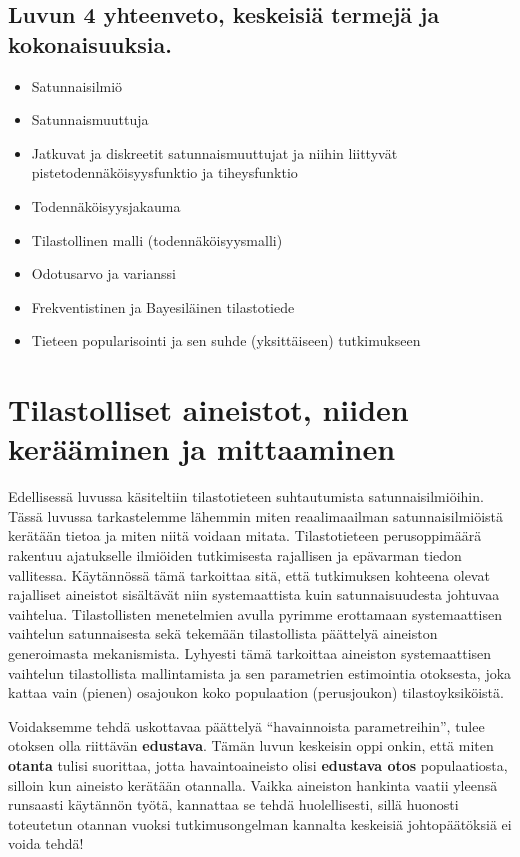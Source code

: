 \documentclass[
]{book}
\providecommand{\tightlist}{%
  \setlength{\itemsep}{0pt}\setlength{\parskip}{0pt}}
\begin{document}
\hypertarget{luvun-4-yhteenveto-keskeisiuxe4-termejuxe4-ja-kokonaisuuksia.}{%
\section{Luvun 4 yhteenveto, keskeisiä termejä ja kokonaisuuksia.}\label{luvun-4-yhteenveto-keskeisiuxe4-termejuxe4-ja-kokonaisuuksia.}}

\begin{itemize}
\tightlist
\item
  Satunnaisilmiö
\item
  Satunnaismuuttuja
\item
  Jatkuvat ja diskreetit satunnaismuuttujat ja niihin liittyvät pistetodennäköisyysfunktio ja tiheysfunktio
\item
  Todennäköisyysjakauma
\item
  Tilastollinen malli (todennäköisyysmalli)
\item
  Odotusarvo ja varianssi
\item
  Frekventistinen ja Bayesiläinen tilastotiede
\item
  Tieteen popularisointi ja sen suhde (yksittäiseen) tutkimukseen
\end{itemize}


\hypertarget{luku5}{%
\chapter{Tilastolliset aineistot, niiden kerääminen ja mittaaminen}\label{luku5}}

Edellisessä luvussa käsiteltiin tilastotieteen suhtautumista satunnaisilmiöihin. Tässä luvussa tarkastelemme lähemmin miten reaalimaailman satunnaisilmiöistä kerätään tietoa ja miten niitä voidaan mitata. Tilastotieteen perusoppimäärä rakentuu ajatukselle ilmiöiden tutkimisesta rajallisen ja epävarman tiedon vallitessa. Käytännössä tämä tarkoittaa sitä, että tutkimuksen kohteena olevat rajalliset aineistot sisältävät niin systemaattista kuin satunnaisuudesta johtuvaa vaihtelua. Tilastollisten menetelmien avulla pyrimme erottamaan systemaattisen vaihtelun satunnaisesta sekä tekemään tilastollista päättelyä aineiston generoimasta mekanismista. Lyhyesti tämä tarkoittaa aineiston systemaattisen vaihtelun tilastollista mallintamista ja sen parametrien estimointia otoksesta, joka kattaa vain (pienen) osajoukon koko populaation (perusjoukon) tilastoyksiköistä.

Voidaksemme tehdä uskottavaa päättelyä ``havainnoista parametreihin'', tulee otoksen olla riittävän \textbf{edustava}. Tämän luvun keskeisin oppi onkin, että miten \textbf{otanta} tulisi suorittaa, jotta havaintoaineisto olisi \textbf{edustava otos} populaatiosta, silloin kun aineisto kerätään otannalla. Vaikka aineiston hankinta vaatii yleensä runsaasti käytännön työtä, kannattaa se tehdä huolellisesti, sillä huonosti toteutetun otannan vuoksi tutkimusongelman kannalta keskeisiä johtopäätöksiä ei voida tehdä!
\end{document}
